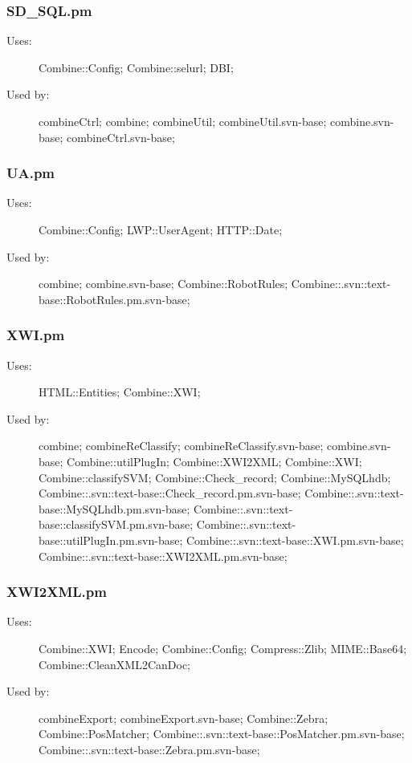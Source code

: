 \subsubsection{SD\_SQL.pm}
\begin{description}
\item[Uses:] Combine::Config; Combine::selurl; DBI; 

\item[Used by:] combineCtrl; combine; combineUtil; combineUtil.svn-base; combine.svn-base; combineCtrl.svn-base; 

\end{description}
\subsubsection{UA.pm}
\begin{description}
\item[Uses:] Combine::Config; LWP::UserAgent; HTTP::Date; 

\item[Used by:] combine; combine.svn-base; Combine::RobotRules; Combine::.svn::text-base::RobotRules.pm.svn-base; 

\end{description}
\subsubsection{XWI.pm}
\begin{description}
\item[Uses:] HTML::Entities; Combine::XWI; 

\item[Used by:] combine; combineReClassify; combineReClassify.svn-base; combine.svn-base; Combine::utilPlugIn; Combine::XWI2XML; Combine::XWI; Combine::classifySVM; Combine::Check\_record; Combine::MySQLhdb; Combine::.svn::text-base::Check\_record.pm.svn-base; Combine::.svn::text-base::MySQLhdb.pm.svn-base; Combine::.svn::text-base::classifySVM.pm.svn-base; Combine::.svn::text-base::utilPlugIn.pm.svn-base; Combine::.svn::text-base::XWI.pm.svn-base; Combine::.svn::text-base::XWI2XML.pm.svn-base; 

\end{description}
\subsubsection{XWI2XML.pm}
\begin{description}
\item[Uses:] Combine::XWI; Encode; Combine::Config; Compress::Zlib; MIME::Base64; Combine::CleanXML2CanDoc; 

\item[Used by:] combineExport; combineExport.svn-base; Combine::Zebra; Combine::PosMatcher; Combine::.svn::text-base::PosMatcher.pm.svn-base; Combine::.svn::text-base::Zebra.pm.svn-base; 

\end{description}
